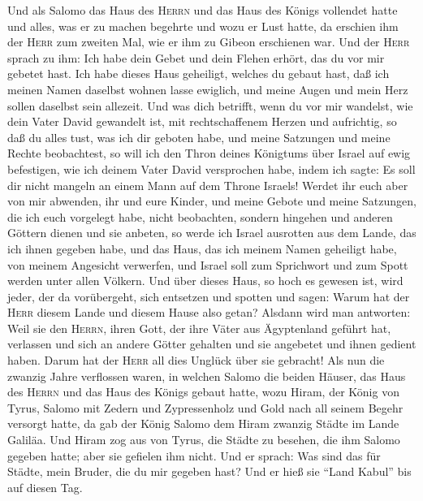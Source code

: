  Und als Salomo das Haus des \textsc{Herrn} und das Haus
des Königs vollendet hatte und alles, was er zu machen begehrte und wozu
er Lust hatte,  da erschien ihm der \textsc{Herr} zum
zweiten Mal, wie er ihm zu Gibeon erschienen war.  Und der
\textsc{Herr} sprach zu ihm: Ich habe dein Gebet und dein Flehen erhört,
das du vor mir gebetet hast. Ich habe dieses Haus geheiligt, welches du
gebaut hast, daß ich meinen Namen daselbst wohnen lasse ewiglich, und
meine Augen und mein Herz sollen daselbst sein allezeit. 
Und was dich betrifft, wenn du vor mir wandelst, wie dein Vater David
gewandelt ist, mit rechtschaffenem Herzen und aufrichtig, so daß du
alles tust, was ich dir geboten habe, und meine Satzungen und meine
Rechte beobachtest,  so will ich den Thron deines
Königtums über Israel auf ewig befestigen, wie ich deinem Vater David
versprochen habe, indem ich sagte: Es soll dir nicht mangeln an einem
Mann auf dem Throne Israels!  Werdet ihr euch aber von mir
abwenden, ihr und eure Kinder, und meine Gebote und meine Satzungen, die
ich euch vorgelegt habe, nicht beobachten, sondern hingehen und anderen
Göttern dienen und sie anbeten,  so werde ich Israel
ausrotten aus dem Lande, das ich ihnen gegeben habe, und das Haus, das
ich meinem Namen geheiligt habe, von meinem Angesicht verwerfen, und
Israel soll zum Sprichwort und zum Spott werden unter allen Völkern.
 Und über dieses Haus, so hoch es gewesen ist, wird jeder,
der da vorübergeht, sich entsetzen und spotten und sagen: Warum hat der
\textsc{Herr} diesem Lande und diesem Hause also getan? 
Alsdann wird man antworten: Weil sie den \textsc{Herrn}, ihren Gott, der
ihre Väter aus Ägyptenland geführt hat, verlassen und sich an andere
Götter gehalten und sie angebetet und ihnen gedient haben. Darum hat der
\textsc{Herr} all dies Unglück über sie gebracht!  Als
nun die zwanzig Jahre verflossen waren, in welchen Salomo die beiden
Häuser, das Haus des \textsc{Herrn} und das Haus des Königs gebaut
hatte,  wozu Hiram, der König von Tyrus, Salomo mit
Zedern und Zypressenholz und Gold nach all seinem Begehr versorgt hatte,
da gab der König Salomo dem Hiram zwanzig Städte im Lande Galiläa.
 Und Hiram zog aus von Tyrus, die Städte zu besehen, die
ihm Salomo gegeben hatte; aber sie gefielen ihm nicht. 
Und er sprach: Was sind das für Städte, mein Bruder, die du mir gegeben
hast? Und er hieß sie ``Land Kabul'' bis auf diesen Tag. 
